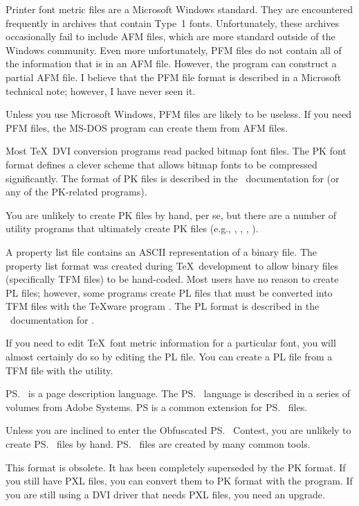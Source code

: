 \begin{iplist}{.25in}
\extitem [pfm] Printer font metric files are a Microsoft Windows standard.
They are encountered frequently in archives that contain Type~1 fonts.
Unfortunately, these archives occasionally fail to include AFM files,
which are more standard outside of the Windows community.  Even more
unfortunately, PFM files do not contain all of the information that is
in an AFM file.  However, the  program can construct a
partial AFM file.  I believe that the PFM file format is described
in a Microsoft technical note; however, I have never seen it.

Unless you use Microsoft Windows, PFM files are likely to be
useless.  If you need PFM files, the MS-DOS program  can
create them from AFM files.

\extitem [pk] Most \TeX\ DVI conversion programs read packed bitmap font
files.  The PK font format defines a clever scheme that allows
bitmap fonts to be compressed significantly.  The format of PK files is
described in the \web\ documentation for  (or any of the
PK-related  programs).

You are unlikely to create PK files by hand, per se, but there are a number
of utility programs that ultimately create PK files (e.g., ,
\MF, , ).

\extitem [pl] A property list file contains an ASCII representation of a
binary file.  The property list format was created during \TeX\ development to
allow binary files (specifically TFM files) to be hand-coded.  Most users have
no reason to create PL files; however, some programs create PL files that must
be converted into TFM files with the \TeX{}ware program .  The
PL format is described in the \web\ documentation for .

If you need to edit \TeX\ font metric information for a particular
font, you will almost certainly do so by editing the PL file.  You can create
a PL file from a TFM file with the  utility.

\extitem [ps] \ps\ is a page description language.  The \ps\ language
is described in a series of volumes from Adobe Systems.  PS is a
common extension for \ps\ files.

Unless you are inclined to enter the Obfuscated \ps\ Contest, you
are unlikely to create \ps\ files by hand.  \ps\ files are created by many
common tools.

\extitem [pxl]  This format is obsolete.  It has been completely superseded
by the PK format.  If you still have PXL files, you can convert
them to PK format with the  program.  If you are still
using a DVI driver that needs PXL files, you need an upgrade.


\end{iplist}
